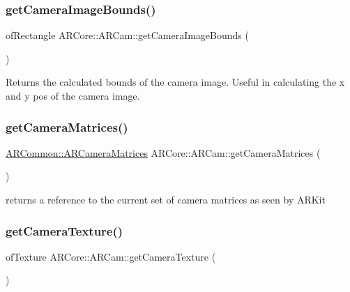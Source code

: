 \subsubsection{\texorpdfstring{get\+Camera\+Image\+Bounds()}{getCameraImageBounds()}}
{\footnotesize\ttfamily of\+Rectangle A\+R\+Core\+::\+A\+R\+Cam\+::get\+Camera\+Image\+Bounds (\begin{DoxyParamCaption}{ }\end{DoxyParamCaption})}

Returns the calculated bounds of the camera image. Useful in calculating the x and y pos of the camera image. \mbox{\label{class_a_r_core_1_1_a_r_cam_a1398ffe9720425cfbc99635b08bc80d6}} 
\subsubsection{\texorpdfstring{get\+Camera\+Matrices()}{getCameraMatrices()}}
{\footnotesize\ttfamily \hyperlink{struct_a_r_common_1_1_a_r_camera_matrices}{A\+R\+Common\+::\+A\+R\+Camera\+Matrices} A\+R\+Core\+::\+A\+R\+Cam\+::get\+Camera\+Matrices (\begin{DoxyParamCaption}{ }\end{DoxyParamCaption})\hspace{0.3cm}{\ttfamily [inline]}}



returns a reference to the current set of camera matrices as seen by A\+R\+Kit 

\mbox{\label{class_a_r_core_1_1_a_r_cam_ae816096383bfc8fbcf6b67ab82b3d629}} 
\subsubsection{\texorpdfstring{get\+Camera\+Texture()}{getCameraTexture()}}
{\footnotesize\ttfamily of\+Texture A\+R\+Core\+::\+A\+R\+Cam\+::get\+Camera\+Texture (\begin{DoxyParamCaption}{ }\end{DoxyParamCaption})\hspace{0.3cm}{\ttfamily [inline]}}



